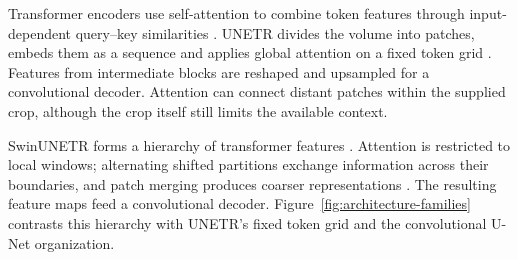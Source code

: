 \documentclass[12pt,a4paper]{article}
\begin{document}
Transformer encoders use self-attention to combine token features through
input-dependent query--key similarities \cite{vaswani2017attention}.
UNETR divides the volume into patches, embeds them as a sequence and
applies global attention on a fixed token grid
\cite{hatamizadeh2021unetr}. Features from intermediate blocks are
reshaped and upsampled for a convolutional decoder. Attention can connect
distant patches within the supplied crop, although the crop itself still
limits the available context.

SwinUNETR forms a hierarchy of transformer features
\cite{hatamizadeh2022swin}. Attention is restricted to local windows;
alternating shifted partitions exchange information across their
boundaries, and patch merging produces coarser representations
\cite{liu2021swin}. The resulting feature maps feed a convolutional
decoder. Figure~\ref{fig:architecture-families} contrasts this hierarchy
with UNETR's fixed token grid and the convolutional U-Net organization.
\end{document}

